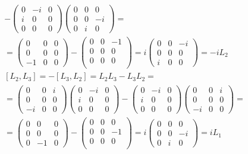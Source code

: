 \documentclass{article}
\begin{document}
\begin{equation}
\begin{gathered}
    -
    \begin{pmatrix} 0 & -i & 0 \\ i & 0 & 0 \\ 0 & 0 & 0\end{pmatrix}
    \begin{pmatrix} 0 & 0 & 0 \\ 0 & 0 & -i \\ 0 & i & 0 \end{pmatrix}
    = \\ =
    \begin{pmatrix} 0 & 0 & 0 \\ 0 & 0 & 0 \\ -1 & 0 & 0 \end{pmatrix}
    -
    \begin{pmatrix} 0 & 0 & -1 \\ 0 & 0 & 0 \\ 0 & 0 & 0 \\ \end{pmatrix}
    = i\begin{pmatrix} 0 & 0 & -i \\ 0 & 0 & 0 \\ i & 0 & 0\end{pmatrix} = -iL_2
    \\
    \left[L_2,L_3\right] = - \left[L_3,L_2\right] = L_2L_3 - L_3L_2 = \\ = 
    \begin{pmatrix} 0 & 0 & i \\ 0 & 0 & 0 \\ -i & 0 & 0\end{pmatrix}
    \begin{pmatrix} 0 & -i & 0 \\ i & 0 & 0 \\ 0 & 0 & 0\end{pmatrix}
    -
    \begin{pmatrix} 0 & -i & 0 \\ i & 0 & 0 \\ 0 & 0 & 0\end{pmatrix}
    \begin{pmatrix} 0 & 0 & i \\ 0 & 0 & 0 \\ -i & 0 & 0\end{pmatrix}
    = \\ =
    \begin{pmatrix} 0 & 0 & 0 \\ 0 & 0 & 0 \\ 0 & -1 & 0 \end{pmatrix}
    -
    \begin{pmatrix} 0 & 0 & 0 \\ 0 & 0 & -1 \\ 0 & 0 & 0 \\ \end{pmatrix}
    = i\begin{pmatrix} 0 & 0 & 0 \\ 0 & 0 & -i \\ 0 & i & 0\end{pmatrix} = iL_1
\end{gathered}
\end{equation}
\end{document}
